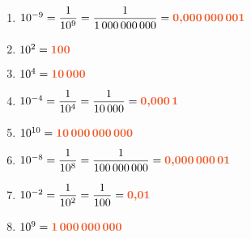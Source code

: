 \documentclass[a4paper,12pt]{report}
\begin{document}
\begin{Correction}
\begin{EXO}{}{}
\begin{enumerate}[]
\item $10^{-9}=\dfrac{1}{10^{9}}=\dfrac{1}{1\,000\,000\,000}={\color[HTML]{f15929}\boldsymbol{0{,}000\,000\,001}}$
\item $10^{2}={\color[HTML]{f15929}\boldsymbol{100}}$
\item $10^{4}={\color[HTML]{f15929}\boldsymbol{10\,000}}$
\item $10^{-4}=\dfrac{1}{10^{4}}=\dfrac{1}{10\,000}={\color[HTML]{f15929}\boldsymbol{0{,}000\,1}}$
\item $10^{10}={\color[HTML]{f15929}\boldsymbol{10\,000\,000\,000}}$
\item $10^{-8}=\dfrac{1}{10^{8}}=\dfrac{1}{100\,000\,000}={\color[HTML]{f15929}\boldsymbol{0{,}000\,000\,01}}$
\item $10^{-2}=\dfrac{1}{10^{2}}=\dfrac{1}{100}={\color[HTML]{f15929}\boldsymbol{0{,}01}}$
\item $10^{9}={\color[HTML]{f15929}\boldsymbol{1\,000\,000\,000}}$
\end{enumerate}

\end{EXO}

\begin{EXO}{}{}


\end{EXO}
\end{Correction}
\end{document}
